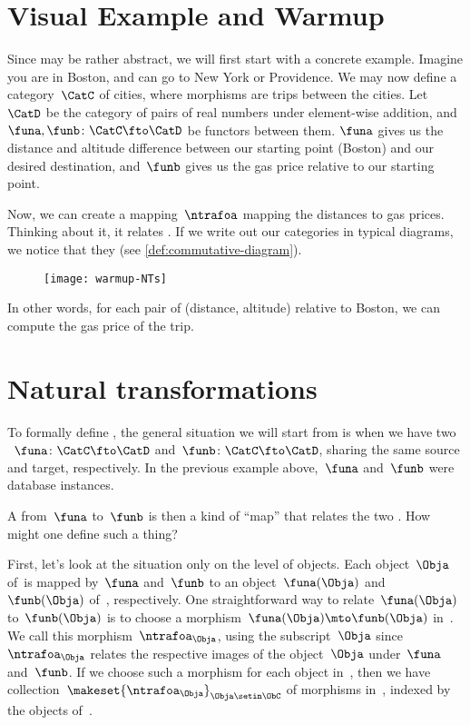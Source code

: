 
\section{Visual Example and Warmup}
Since  may be rather abstract, we will first start with a concrete example.
Imagine you are in Boston, and can go to New York or Providence.
We may now define a category~$\CatC$ of cities, where morphisms are trips between the cities.
Let~$\CatD$ be the category of pairs of real numbers under element-wise addition, and~$\funa, \funb\colon\CatC\fto\CatD$ be functors between them.
$\funa$ gives us the distance and altitude difference between our starting point (Boston) and our desired destination, and~$\funb$ gives us the gas price relative to our starting point.

Now, we can create a mapping~$\ntrafoa$ mapping the distances to gas prices.
Thinking about it, it relates .
If we write out our categories in typical diagrams, we notice that they  (see \cref{def:commutative-diagram}).

\begin{figure}[h]
    \texttt{[image: warmup-NTs]}
\end{figure}

In other words, for each pair of (distance, altitude) relative to Boston, we can compute the gas price of the trip.

\section{Natural transformations}

To formally define , the general situation we will start from is when we have two ~$\funa \colon \CatC \fto \CatD$ and~$\funb \colon \CatC \fto \CatD$, sharing the same source and target, respectively.
In the previous example above,~$\funa$ and~$\funb$ were database instances.

A  from~$\funa$ to~$\funb$ is then a kind of ``map'' that relates the two .
How might one define such a thing?

First, let's look at the situation only on the level of objects.
Each object~$\Obja$ of~\CatC is mapped by~$\funa$ and~$\funb$ to an object~$\funa(\Obja)$ and~$\funb(\Obja)$ of~\CatD, respectively.
One straightforward way to relate~$\funa(\Obja)$ to~$\funb(\Obja)$ is to choose a morphism~$\funa(\Obja) \mto \funb(\Obja)$ in~\CatD.
We call this morphism~$\ntrafoa_{\Obja}$, using the subscript~$\Obja$ since~$\ntrafoa_{\Obja}$ relates the respective images of the object~$\Obja$ under~$\funa$ and~$\funb$.
If we choose such a morphism for each object in~\CatC, then we have collection~$\makeset{ \ntrafoa_\Obja }_{\Obja \setin \ObC}$ of morphisms in~\CatD, indexed by the objects of~\CatC.

